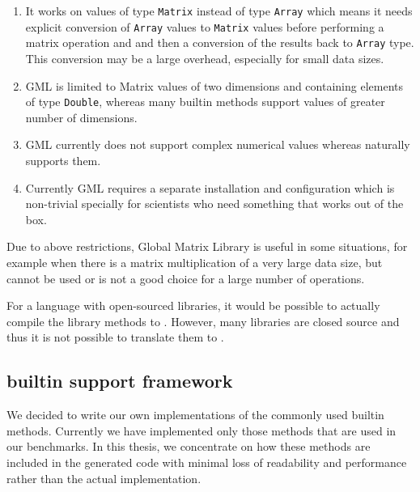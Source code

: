 \begin{enumerate}

\item It works on values of type \verb|Matrix| instead of \xten type
\verb|Array| which means it needs explicit conversion of \verb|Array|
values to \verb|Matrix| values before performing a matrix operation and
and then a conversion of the results back to \verb|Array| type. This
conversion may be  a large overhead, especially for small data sizes.

\item GML is limited to Matrix values of two dimensions and containing
elements of type \verb|Double|, whereas many \matlab builtin methods
support values of greater number of dimensions.

\item GML currently does not support complex numerical values whereas
\matlab naturally supports them.

\item Currently GML requires a separate installation and configuration which
is non-trivial specially for scientists who need something that works
out of the box.


\end{enumerate}

Due to above restrictions, \xten Global Matrix Library is useful in some
situations, for example when there is a matrix multiplication of a very
large data size, but cannot be used or is not a good choice for a large
number of operations.

For a language with open-sourced libraries, it would be possible to actually
compile the library methods to \xten.  However,  many \matlab libraries 
are closed source and thus it is not possible to translate them to \xten.

\subsection{\mixten builtin support framework}

We decided to write our own \xten implementations of the commonly used
\matlab builtin methods. Currently we have implemented
only those methods that are used in our benchmarks. In this thesis, we
concentrate on how these methods are included in the generated \xten
code with minimal loss of readability and performance rather than the
actual implementation.

